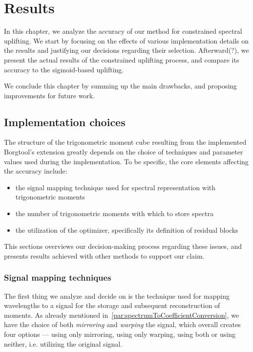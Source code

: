 \chapter{Results} \label{chap:results}

In this chapter, we analyze the accuracy of our method for constrained spectral uplifting. We start by focusing on the effects of various implementation details on the results and justifying our decisions regarding their selection. Afterward(?), we present the actual results of the constrained uplifting process, and compare its accuracy to the sigmoid-based uplifting.

We conclude this chapter by summing up the main drawbacks, and proposing improvements for future work.

\section{Implementation choices}

The structure of the trigonometric moment cube resulting from the implemented Borgtool's extension greatly depends on the choice of techniques and parameter values used during the implementation. To be specific, the core elements affecting the accuracy include:
\begin{itemize}
	\item the signal mapping technique used for spectral representation with trigonometric moments
	\item the number of trigonometric moments with which to store spectra
	\item the utilization of the optimizer, specifically its definition of residual blocks
\end{itemize}

This sections overviews our decision-making process regarding these issues, and presents results achieved with other methods to support our claim.

\subsection{Signal mapping techniques} \label{sec:storingMoments}

The first thing we analyze and decide on is the technique used for mapping wavelengths to a signal for the storage and subsequent reconstruction of moments. As already mentioned in~\cref{par:spectrumToCoefficientConversion}, we have the choice of both \emph{mirroring} and \emph{warping} the signal, which overall creates four options --- using only mirroring, using only warping, using both or using neither, i.e. utilizing the original signal.

